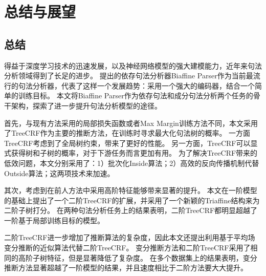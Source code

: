 \chapter{总结与展望}

\section{总结}
得益于深度学习技术的迅速发展，以及神经网络模型的强大建模能力，近年来句法分析领域得到了长足的进步。
\citet{dozat-etal-2017-biaffine}提出的依存句法分析器Biaffine Parser作为当前最流行的句法分析器，代表了这样一个发展趋势：采用一个强大的编码器，结合一个简单的训练目标。
本文将Biaffine Parser作为依存句法和成分句法分析两个任务的骨干架构，探索了进一步提升句法分析模型的途径。

首先，与现有方法采用的局部损失函数或者Max Margin训练方法不同，本文采用了TreeCRF作为主要的推断方法，在训练时寻求最大化句法树的概率。
一方面TreeCRF考虑到了全局树约束，带来了更好的性能。
另一方面，TreeCRF可以显式获得树和子树的概率，对于下游任务而言更加有用。
为了解决TreeCRF带来的低效问题，本文分别采用了：1）批次化Inside算法；2）高效的反向传播机制代替Outside算法；这两项技术来加速。

其次，考虑到在前人方法中采用高阶特征能够带来显著的提升。
本文在一阶模型的基础上提出了一个二阶TreeCRF的扩展，并采用了一个新颖的Triaffine结构来为二阶子树打分。
在两种句法分析任务上的结果表明，二阶TreeCRF都明显超越了一阶基于局部训练目标的模型。

二阶TreeCRF进一步增加了推断算法的复杂度，因此本文还提出利用基于平均场变分推断的近似算法代替二阶TreeCRF。
变分推断方法和二阶TreeCRF采用了相同的高阶子树特征，但是显著降低了复杂度。
在多个数据集上的结果表明，变分推断方法显著超越了一阶模型的结果，并且速度相比于二阶方法要大大提升。

